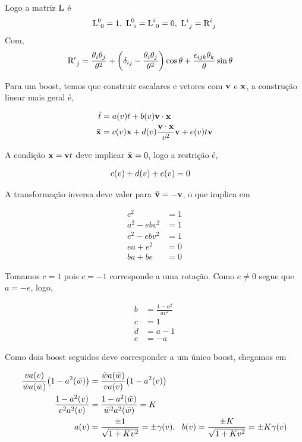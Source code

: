 \documentclass[twoside]{amsart}
\numberwithin{equation}{section}
\begin{document}
Logo a matriz $\textup L$ é $${\textup L}^{0}_{\ 0}=1,\ {\textup L}^0_{\ i}={\textup L}^{i}_{\ 0}=0,\ {\textup L}^{i}_{\ j}={\textup R}^{i}_{\ j}$$
Com,
\begin{align}
    {\textup R}^{i}_{\ j}&=\frac{\theta_i\theta_{j}}{\theta^2}+\qty(\delta_{ij}-\frac{\theta_{i}\theta_j}{\theta^2})\cos\theta+\frac{\epsilon_{ijk}\theta_k}{\theta}\sin\theta
\end{align}

Para um boost, temos que construir escalares e vetores com $\vb v$ e $\vb x$, a construção linear mais geral é,

\begin{align}
    {\bar t}&=a\qty(v)t+b\qty(v)\vb v\cdot \vb x\\
    \vb {\bar x}&=c\qty(v)\vb x+d\qty(v)\frac{\vb v\cdot \vb x}{v^2}\vb v+e\qty(v)t\vb v
\end{align}

A condição $\vb x=\vb v t$ deve implicar $\vb{\bar x}=0$, logo a restrição é,

\begin{align}
    c\qty(v)+d\qty(v)+e\qty(v)&=0
\end{align}

A transformação inversa deve valer para $\vb {\bar v}=-\vb v$, o que implica em

\begin{align}
    c^2&=1\\
    a^2-ebv^2&=1\\
    e^2-ebv^2&=1\\
    ea+e^2&=0\\
    ba+be&=0
\end{align}

Tomamos $c=1$ pois $c=-1$ corresponde a uma rotação. Como $e\neq 0$ segue que $a=-e$, logo,

\begin{align}
    b&=\frac{1-a^2}{av^2}\\
    c&=1\\
    d&=a-1\\
    e&=-a
\end{align}

Como dois boost seguidos deve corresponder a um único boost, chegamos em

\begin{align}
    \frac{va\qty(v)}{\bar wa\qty(\bar w)}\qty(1-a^2\qty(\bar w))&=\frac{\bar wa\qty(\bar w)}{va\qty(v)}\qty(1-a^2\qty(v))\\
    \frac{1-a^2\qty(v)}{v^2a^2\qty(v)}&=\frac{1-a^2\qty(\bar w)}{{\bar w}^2a^2\qty({\bar w})}=K\\
    a\qty(v)&=\frac{\pm 1}{\sqrt{1+Kv^2}}=\pm \gamma\qty(v),\ \ b\qty(v)=\frac{\pm K}{\sqrt{1+Kv^2}}=\pm K\gamma\qty(v) 
\end{align}
\end{document}
